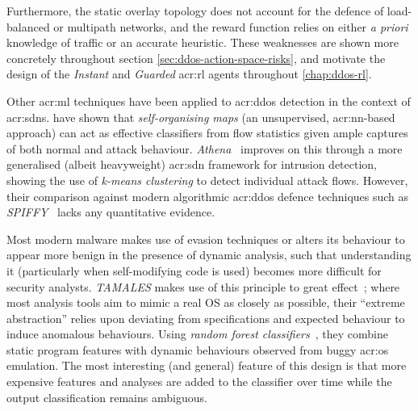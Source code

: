 Furthermore, the static overlay topology does not account for the defence of load-balanced or multipath networks, and the reward function relies on either \emph{a priori} knowledge of traffic or an accurate heuristic.
These weaknesses are shown more concretely throughout section \cref{sec:ddos-action-space-risks}, and motivate the design of the \emph{Instant} and \emph{Guarded} \gls{acr:rl} agents throughout \cref{chap:ddos-rl}.

Other \gls{acr:ml} techniques have been applied to \gls{acr:ddos} detection in the context of \glspl{acr:sdn}.
\textcite{DBLP:conf/lcn/BragaMP10} have shown that \emph{self-organising maps} (an unsupervised, \gls{acr:nn}-based approach) can act as effective classifiers from flow statistics given ample captures of both normal and attack behaviour.
\emph{Athena}~\parencite{DBLP:conf/dsn/LeeKSPY17} improves on this through a more generalised (albeit heavyweight) \gls{acr:sdn} framework for intrusion detection, showing the use of \emph{k-means clustering} to detect individual attack flows.
However, their comparison against modern algorithmic \gls{acr:ddos} defence techniques such as \emph{SPIFFY}~\parencite{DBLP:conf/ndss/KangGS16} lacks any quantitative evidence.

Most modern malware makes use of evasion techniques or alters its behaviour to appear more benign in the presence of dynamic analysis, such that understanding it (particularly when self-modifying code is used) becomes more difficult for security analysts.
\emph{TAMALES} makes use of this principle to great effect~\parencite{DBLP:conf/acsac/CoptyDEEMZ18}; where most analysis tools aim to mimic a real OS as closely as possible, their ``extreme abstraction'' relies upon deviating from specifications and expected behaviour to induce anomalous behaviours.
Using \emph{random forest classifiers}~\parencite{DBLP:journals/ml/Breiman01}, they combine static program features with dynamic behaviours observed from buggy \gls{acr:os} emulation.
The most interesting (and general) feature of this design is that more expensive features and analyses are added to the classifier over time while the output classification remains ambiguous.

